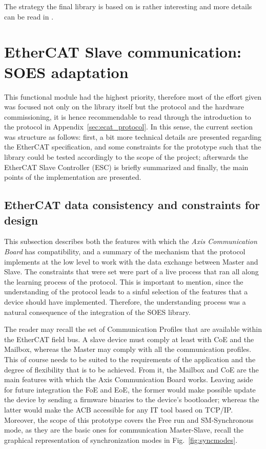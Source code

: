 The strategy the final library is based on is rather interesting and more details can be read in \cite{onewire_theory}.

\section{EtherCAT Slave communication: SOES adaptation}\label{sec:soes}

This functional module had the highest priority, therefore most of the effort given was focused not only 
on the library itself but the protocol and the hardware commissioning, it is hence recommendable to read through the introduction 
to the protocol in Appendix~\ref{sec:ecat_protocol}. In this sense, the current section was structure
as follows: first, a bit more technical details are presented regarding the EtherCAT specification, and some constraints for 
the prototype such that the library could be tested accordingly to the scope of the project; afterwards the EtherCAT Slave
Controller (ESC) is briefly summarized and finally, the main points of the implementation are presented.

\subsection{EtherCAT data consistency and constraints for design}\label{sec:ecat_sms}
This subsection describes both the features with which the \emph{Axis Communication Board} has compatibility, and a summary of the mechanism that the protocol
implements at the low level to work with the data exchange between Master and Slave. The constraints that were set were part of a live process that ran 
all along
the learning process of the protocol. This is important to mention, since the understanding of the protocol leads to a sinful selection of the features
that a device should have implemented. Therefore, the understanding process was a natural consequence of the integration of the SOES library. 

The reader may recall the set of Communication Profiles that are available within the EtherCAT field bus. 
A slave device must comply at least with CoE and the Mailbox, whereas the Master may comply with all the communication profiles. This of course
needs to be suited to the requirements of the application and the degree of flexibility that is to be achieved. From it, 
the Mailbox and CoE 
are the main features with which the Axis Communication Board works. Leaving aside for future integration the FoE and EoE, the former would make possible 
update the device by sending a firmware binaries to the device's bootloader; whereas the latter would make the ACB accessible for any IT tool based on TCP/IP.
Moreover, the scope of this prototype covers the Free run and SM-Synchronous mode, as they are the basic ones for communication Master-Slave, recall 
the graphical representation of synchronization modes in Fig.~\ref{fig:syncmodes}.

